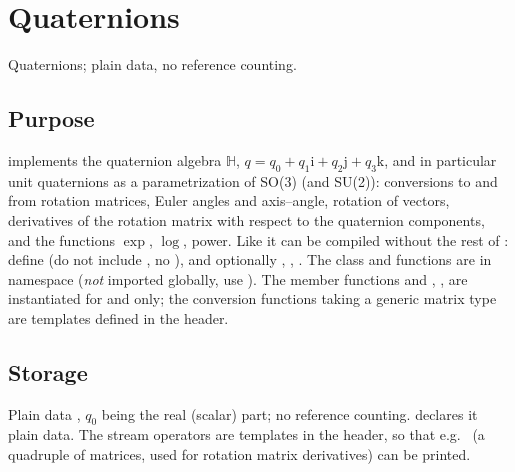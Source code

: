 \chapter{Quaternions}\label{ch:quaternion}

Quaternions; plain data, no reference counting.

\section{Purpose}
 implements the quaternion algebra $\mathbb H$, $q=q_0+q_1\mathrm i+q_2\mathrm j+q_3\mathrm k$,
and in particular unit quaternions as a parametrization of SO(3) (and SU(2)): conversions to and
from rotation matrices, Euler angles and axis--angle, rotation of vectors, derivatives of the
rotation matrix with respect to the quaternion components, and the functions $\exp$, $\log$, power.
Like  it can be compiled without the rest of \LA{}: define 
(do not include , no ), and optionally ,
, . The class and functions are in namespace
 (\emph{not} imported globally, use ).
The member functions and , ,  are instantiated for 
and  only; the conversion functions taking a generic matrix type  are
templates defined in the header.

\section{Storage}
Plain data , $q_0$ being the real (scalar) part; no reference counting.
 declares it plain data. The stream operators are templates in the
header, so that e.g.\  (a quadruple of matrices, used for
rotation matrix derivatives) can be printed.

